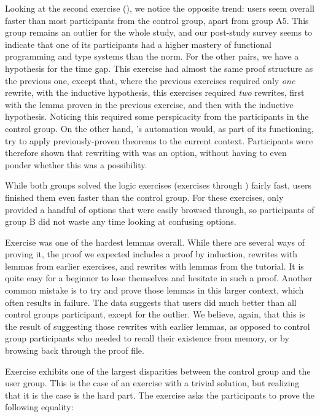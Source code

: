 Looking at the second exercise (), we notice the
opposite trend: \PeaCoq{} users seem overall faster than most participants from
the control group, apart from group $\text{A}5$.  This group remains an outlier
for the whole study, and our post-study survey seems to indicate that one of its
participants had a higher mastery of functional programming and type systems
than the norm.  For the other pairs, we have a hypothesis for the time gap.
This exercise had almost the same proof structure as the previous one, except
that, where the previous exercises required only \emph{one} rewrite, with the
inductive hypothesis, this exercises required \emph{two} rewrites, first with
the lemma proven in the previous exercise, and then with the inductive
hypothesis.  Noticing this required some perspicacity from the participants in
the control group.  On the other hand, \PeaCoq{}'s automation would, as part of
its functioning, try to apply previously-proven theorems to the current context.
Participants were therefore shown that rewriting with  was
an option, without having to even ponder whether this was a possibility.

While both groups solved the logic exercises (exercises 
through ) fairly fast, \PeaCoq{} users finished them even
faster than the control group.  For these exercises, \PeaCoq{} only provided a
handful of options that were easily browsed through, so participants of group B
did not waste any time looking at confusing options.

Exercise  was one of the hardest lemmas
overall.  While there are several ways of proving it, the proof we expected
includes a proof by induction, rewrites with lemmas from earlier exercises, and
rewrites with lemmas from the tutorial.  It is quite easy for a beginner to lose
themselves and hesitate in such a proof.  Another common mistake is to try and
prove those lemmas in this larger context, which often results in failure.  The
data suggests that \PeaCoq{} users did much better than all control groups
participant, except for the outlier.  We believe, again, that this is the result
of \PeaCoq{} suggesting those rewrites with earlier lemmas, as opposed to
control group participants who needed to recall their existence from memory, or
by browsing back through the proof file.

Exercise  exhibits one of the largest disparities between
the control group and the \PeaCoq{} user group.  This is the case of an exercise
with a trivial solution, but realizing that it is the case is the hard part.
The exercise asks the participants to prove the following equality:

